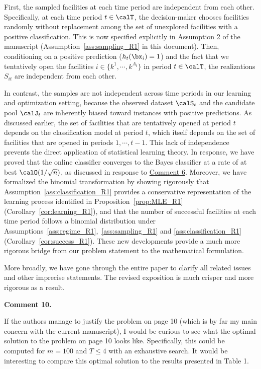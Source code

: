 \documentclass[11pt]{article}
\begin{document}
First, the sampled facilities at each time period are independent from each other. Specifically, at each time period $t\in\calT$, the decision-maker chooses facilities randomly without replacement among the set of unexplored facilities with a positive classification. This is now specified explicitly in Assumption 2 of the manuscript (Assumption~\ref{ass:sampling_R1} in this document). Then, conditioning on a positive prediction ($h_t(\bx_{i})=1$) and the fact that we tentatively open the facilities $i\in\{k^1,\cdots,k^{A_t}\}$ in period $t\in\calT$, the realizations $S_{it}$ are independent from each other.

In contrast, the samples are not independent across time periods in our learning and optimization setting, because the observed dataset $\calS_t$ and the candidate pool $\calJ_t$ are inherently biased toward instances with positive predictions. As discussed earlier, the set of facilities that are tentatively opened at period $t$ depends on the classification model at period $t$, which itself depends on the set of facilities that are opened in periods $1,\cdots,t-1$. This lack of independence prevents the direct application of statistical learning theory. In response, we have proved that the online classifier converges to the Bayes classifier at a rate of at best $\calO(1/\sqrt{n})$, as discussed in response to \hyperref[R1:6]{\color{blue}Comment 6}. Moreover, we have formalized the binomial transformation by showing rigorously that Assumption~\ref{ass:classification_R1} provides a conservative representation of the learning process identified in Proposition~\ref{prop:MLE_R1} (Corollary~\ref{cor:learning_R1}), and that the number of successful facilities at each time period follows a binomial distribution under Assumptions~\ref{ass:regime_R1},~\ref{ass:sampling_R1} and \ref{ass:classification_R1} (Corollary~\ref{cor:success_R1}). These new developments provide a much more rigorous bridge from our problem statement to the mathematical formulation.

More broadly, we have gone through the entire paper to clarify all related issues and other imprecise statements. The revised exposition is much crisper and more rigorous as a result.

\begin{commentBox}
\textbf{Comment 10.}\label{R1:10}

    If the authors manage to justify the problem on page 10 (which is by far my main concern with the current manuscript), I would be curious to see what the optimal solution to the problem on page 10 looks like. Specifically, this could be computed for $m=100$ and $T \leq 4$ with an exhaustive search. It would be interesting to compare this optimal solution to the results presented in Table 1.
\end{commentBox}
\end{document}
